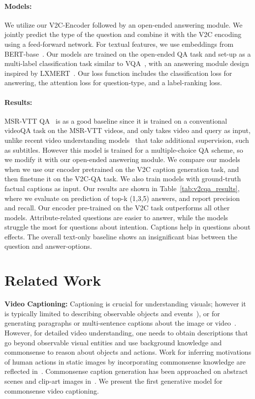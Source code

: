 \paragraph{Models:}
We utilize our V2C-Encoder followed by an open-ended answering module.
We jointly predict the type of the question and combine it with the V2C encoding using a feed-forward network.
For textual features, we use embeddings from BERT-base~\cite{devlin2018bert}.
Our models are trained on the open-ended QA task and set-up as a multi-label classification task similar to VQA~\cite{antol2015vqa}, with an answering module design inspired by LXMERT~\cite{tan2019lxmert}.
Our loss function includes the classification loss for answering, the attention loss for question-type, and a label-ranking loss.


\paragraph{Results:}
MSR-VTT QA~\cite{xu2017video} is as a good baseline since it is trained on a conventional videoQA task on the MSR-VTT videos, and only takes video and query as input, unlike recent video understanding models~\cite{lei2018tvqa} that take additional supervision, such as subtitles.
However this model is trained for a multiple-choice QA scheme, so we modify it with our open-ended answering module.
We compare our models when we use our encoder pretrained on the V2C caption generation task, and then finetune it on the V2C-QA task.
We also train models with ground-truth factual captions as input.
Our results are shown in Table~\ref{tab:v2cqa_results}, where we evaluate on prediction of top-k (1,3,5) answers, and report precision and recall.
Our encoder pre-trained on the V2C task outperforms all other models.
Attribute-related questions are easier to answer, while the models struggle the most for questions about intention. Captions help in questions about effects.
The overall text-only baseline shows an insignificant bias between the question and answer-options.

\section{Related Work}
    \noindent\textbf{Video Captioning:}
    Captioning is crucial for understanding visuals; however it is typically limited to describing observable objects and events~\cite{yang2011corpus,thomason2014integrating,gan2017semantic}),
    or for generating paragraphs or multi-sentence captions about the image or video~\cite{krause2016paragraphs,krishna2017dense}.
    However, for detailed video understanding, one needs to obtain descriptions that go beyond observable visual entities and use background knowledge and commonsense to reason about objects and actions.
    Work for inferring motivations of human actions in static images by incorporating commonsense knowledge are reflected in~\citet{pirsiavash2014inferring,vondrick2016predicting}.
    Commonsense caption generation has been approached on abstract scenes and clip-art images in~\citet{vedantamLinICCV15}.
    We present the first generative model for commonsense video captioning.
    
